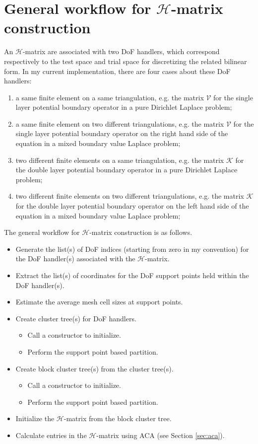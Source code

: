 \documentclass[11pt, a4paper]{book}
\begin{document}
\section{General workflow for $\mathcal{H}$-matrix construction}

An \(\mathcal{H}\)-matrix are associated with two DoF handlers, which correspond
respectively to the test space and trial space for discretizing the related bilinear form.
In my current implementation, there are four cases about these DoF handlers:
\begin{enumerate}
\item a same finite element on a same triangulation, e.g. the matrix $\mathscr{V}$ for the
  single layer potential boundary operator in a pure Dirichlet Laplace problem;
\item a same finite element on two different triangulations, e.g. the matrix $\mathscr{V}$
  for the single layer potential boundary operator on the right hand side of the equation
  in a mixed boundary value Laplace problem;
\item two different finite elements on a same triangulation, e.g. the matrix $\mathscr{K}$
  for the double layer potential boundary operator in a pure Dirichlet Laplace problem;
\item two different finite elements on two different triangulations, e.g. the matrix
  $\mathscr{K}$ for the double layer potential boundary operator on the left hand side of
  the equation in a mixed boundary value Laplace problem;
\end{enumerate}

The general workflow for $\mathcal{H}$-matrix construction is as follows.
\begin{itemize}
\item Generate the list(s) of DoF indices (starting from zero in my convention) for the DoF
  handler(s) associated with the $\mathcal{H}$-matrix.
\item Extract the list(s) of coordinates for the DoF support points held within the DoF handler(s).
\item Estimate the average mesh cell sizes at support points.
\item Create cluster tree(s) for DoF handlers.
  \begin{itemize}
  \item Call a constructor to initialize.
  \item Perform the support point based partition.
  \end{itemize}
\item Create block cluster tree(s) from the cluster tree(s).
  \begin{itemize}
  \item Call a constructor to initialize.
  \item Perform the support point based partition.
  \end{itemize}
\item Initialize the \(\mathcal{H}\)-matrix from the block cluster tree.
\item Calculate entries in the $\mathcal{H}$-matrix using ACA (see Section \ref{sec:aca}).
\end{itemize}
\end{document}
